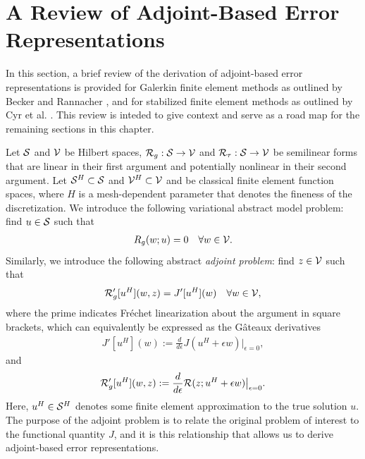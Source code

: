\section{A Review of Adjoint-Based Error Representations}

In this section, a brief review of the derivation of adjoint-based
error representations is provided for Galerkin finite element methods as
outlined by Becker and Rannacher \cite{becker2001optimal}, and for
stabilized finite element methods as outlined by Cyr et al. \cite{cyr2014approaches}.
This review is inteded to give context and serve as a road map for the remaining
sections in this chapter.

Let $\S$ and $\V$ be Hilbert spaces, $\R_g : \S \to \V$ and
$\R_{\tau} : \S \to \V$ be semilinear forms that are linear in their first
argument and potentially nonlinear in their second argument. Let
$\S^H \subset \S$ and $\V^H \subset \V$ and be classical finite element
function spaces, where $H$ is a mesh-dependent parameter that denotes the
fineness of the discretization. We introduce the following variational
abstract model problem: find $u \in \S$ such that
%
\begin{gather}
R_g(w; u) = 0 \quad \forall w \in \V.
\label{eq:aut_abstract_primal}
\end{gather}
%
Similarly, we introduce the following abstract \emph{adjoint problem}:
find $z \in \V$ such that
%
\begin{gather}
\R_g'[u^H](w, z) = J'[u^H](w) \quad \forall w \in \V,
\label{eq:aut_abstract_adjoint}
\end{gather}
%
where the prime indicates Fr\'{e}chet linearization about the argument in
square brackets, which can equivalently be expressed as the G\^{a}teaux
derivatives
%
\begin{gather}
J'[u^H](w) :=
\frac{d}{d \epsilon} J(u^H + \epsilon w) \bigr|_{\epsilon = 0},
\end{gather}
%
and
%
\begin{gather}
\R_g'[u^H](w, z) :=
\frac{d}{d \epsilon} \R(z; u^H + \epsilon w) \bigr|_{\epsilon = 0}.
\end{gather}
%
Here, $u^H \in \S^H$ denotes some finite element approximation to the
true solution $u$. The purpose of the adjoint problem is to relate the
original problem of interest to the functional quantity $J$, and it is this
relationship that allows us to derive adjoint-based error representations.

